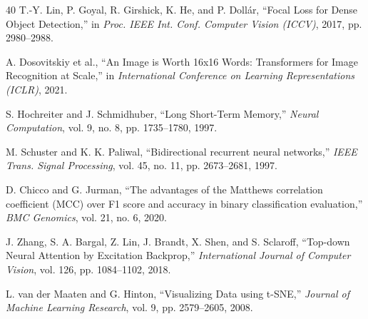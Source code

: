 \documentclass[conference]{IEEEtran}
\begin{document}
\begin{thebibliography}{40}
T.-Y. Lin, P. Goyal, R. Girshick, K. He, and P. Doll{\'a}r, ``Focal Loss for Dense Object Detection,'' in \emph{Proc. IEEE Int. Conf. Computer Vision (ICCV)}, 2017, pp. 2980--2988.

A. Dosovitskiy et al., ``An Image is Worth 16x16 Words: Transformers for Image Recognition at Scale,'' in \emph{International Conference on Learning Representations (ICLR)}, 2021.

S. Hochreiter and J. Schmidhuber, ``Long Short-Term Memory,'' \emph{Neural Computation}, vol. 9, no. 8, pp. 1735--1780, 1997.

M. Schuster and K. K. Paliwal, ``Bidirectional recurrent neural networks,'' \emph{IEEE Trans. Signal Processing}, vol. 45, no. 11, pp. 2673--2681, 1997.

D. Chicco and G. Jurman, ``The advantages of the Matthews correlation coefficient (MCC) over F1 score and accuracy in binary classification evaluation,'' \emph{BMC Genomics}, vol. 21, no. 6, 2020.

J. Zhang, S. A. Bargal, Z. Lin, J. Brandt, X. Shen, and S. Sclaroff, ``Top-down Neural Attention by Excitation Backprop,'' \emph{International Journal of Computer Vision}, vol. 126, pp. 1084--1102, 2018.

L. van der Maaten and G. Hinton, ``Visualizing Data using t-SNE,'' \emph{Journal of Machine Learning Research}, vol. 9, pp. 2579--2605, 2008.

\end{thebibliography}
\end{document}

